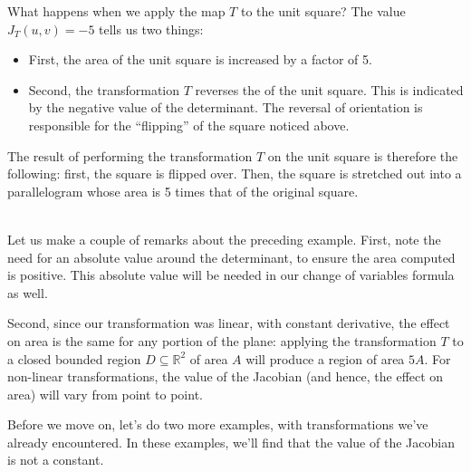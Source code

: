 {What happens when we apply the map $T$ to the unit square? The value $J_T(u,v)=-5$ tells us two things:
\begin{itemize}
\item First, the area of the unit square is increased by a factor of 5.
\item Second, the transformation $T$ reverses the  of the unit square. This is indicated by the negative value of the determinant. The reversal of orientation is responsible for the ``flipping'' of the square noticed above.
\end{itemize} 
The result of performing the transformation $T$ on the unit square is therefore the following: first, the square is flipped over. Then, the square is stretched out into a parallelogram whose area is 5 times that of the original square.
}\\

Let us make a couple of remarks about the preceding example. First, note the need for an absolute value around the determinant, to ensure the area computed is positive. This absolute value will be needed in our change of variables formula as well.

Second, since our transformation was linear, with constant derivative, the effect on area is the same for any portion of the plane: applying the transformation $T$ to a closed bounded region $D\subseteq \mathbb{R}^2$ of area $A$ will produce a region of area $5A$. For non-linear transformations, the value of the Jacobian (and hence, the effect on area) will vary from point to point.

Before we move on, let's do two more examples, with transformations we've already encountered. In these examples, we'll find that the value of the Jacobian is not a constant.\\

